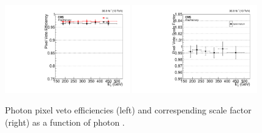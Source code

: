 \begin{figure}[htbp]
  \begin{center}
    \includegraphics[width=0.48\textwidth]{Calibration/Figures/pvsf/efficiency_barrel_medium.pdf}
    \includegraphics[width=0.48\textwidth]{Calibration/Figures/pvsf/scalefactor_barrel_medium.pdf}
    \caption{
      Photon pixel veto efficiencies (left) and correspending scale factor (right) as a function of photon \pt.
    }
    \label{fig:pvsf_results}
  \end{center}
\end{figure}
